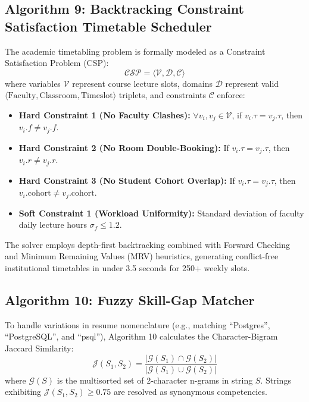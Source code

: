 \documentclass[11pt,a4paper]{article}
\begin{document}
\subsection{Algorithm 9: Backtracking Constraint Satisfaction Timetable Scheduler}
The academic timetabling problem is formally modeled as a Constraint Satisfaction Problem (CSP):
\begin{equation}
\mathcal{CSP} = \langle \mathcal{V}, \mathcal{D}, \mathcal{C} \rangle
\end{equation}
where variables $\mathcal{V}$ represent course lecture slots, domains $\mathcal{D}$ represent valid $\langle \text{Faculty}, \text{Classroom}, \text{Timeslot} \rangle$ triplets, and constraints $\mathcal{C}$ enforce:
\begin{itemize}[noitemsep]
    \item \textbf{Hard Constraint 1 (No Faculty Clashes):} $\forall v_i, v_j \in \mathcal{V}$, if $v_i.\tau = v_j.\tau$, then $v_i.f \ne v_j.f$.
    \item \textbf{Hard Constraint 2 (No Room Double-Booking):} If $v_i.\tau = v_j.\tau$, then $v_i.r \ne v_j.r$.
    \item \textbf{Hard Constraint 3 (No Student Cohort Overlap):} If $v_i.\tau = v_j.\tau$, then $v_i.\text{cohort} \ne v_j.\text{cohort}$.
    \item \textbf{Soft Constraint 1 (Workload Uniformity):} Standard deviation of faculty daily lecture hours $\sigma_f \le 1.2$.
\end{itemize}
The solver employs depth-first backtracking combined with Forward Checking and Minimum Remaining Values (MRV) heuristics, generating conflict-free institutional timetables in under 3.5 seconds for 250+ weekly slots.

\subsection{Algorithm 10: Fuzzy Skill-Gap Matcher}
To handle variations in resume nomenclature (e.g., matching ``Postgres'', ``PostgreSQL'', and ``psql''), Algorithm 10 calculates the Character-Bigram Jaccard Similarity:
\begin{equation}
\mathcal{J}(S_1, S_2) = \frac{|\mathcal{G}(S_1) \cap \mathcal{G}(S_2)|}{|\mathcal{G}(S_1) \cup \mathcal{G}(S_2)|}
\label{eq:jaccard}
\end{equation}
where $\mathcal{G}(S)$ is the multisorted set of 2-character n-grams in string $S$. Strings exhibiting $\mathcal{J}(S_1, S_2) \ge 0.75$ are resolved as synonymous competencies.
\end{document}

